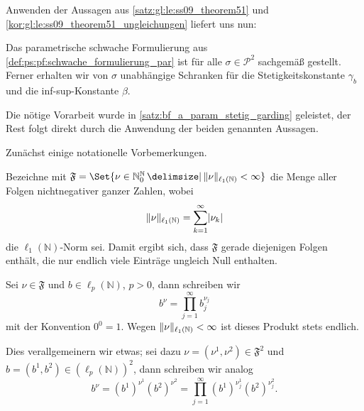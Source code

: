 Anwenden der Aussagen aus \cref{satz:gl:le:ss09_theorem51} und \cref{kor:gl:le:ss09_theorem51_ungleichungen} liefert uns nun:
\begin{Korollar}
\label{satz:ps:eel:schwache_formulierung_sachgemaess_gestellt}
    Das parametrische schwache Formulierung aus \cref{def:ps:pf:schwache_formulierung_par} ist für alle $\sigma \in \mathcal P^{2}$ sachgemäß gestellt.
    Ferner erhalten wir von $\sigma$ unabhängige Schranken für die Stetigkeitskonstante $\gamma_{b}$ und die inf-sup-Konstante $\beta$.

    \begin{Beweis}
        Die nötige Vorarbeit wurde in \cref{satz:bf_a_param_stetig_garding} geleistet, der Rest folgt direkt durch die Anwendung der beiden genannten Aussagen.
    \end{Beweis}
\end{Korollar}

Zunächst einige notationelle Vorbemerkungen.
\begin{Bemerkung}
    Bezeichne mit $\mathfrak F = \Set{ \nu \in \mathbb{N}^{\mathbb{N}}_{0} \given \norm{\nu}_{\ell_{1}(\mathbb{N})} < \infty }$ die Menge aller Folgen nichtnegativer ganzer Zahlen, wobei
    \begin{equation}
        \lVert\nu\rVert_{\ell_{1}(\mathbb{N})} = \sum_{k = 1}^{\infty} \lvert\nu_{k}\rvert
    \end{equation}
    die $\ell_{1}(\mathbb{N})$-Norm sei.
    Damit ergibt sich, dass $\mathfrak F$ gerade diejenigen Folgen enthält, die nur endlich viele Einträge ungleich Null enthalten.

    Sei $\nu \in \mathfrak F$ und $b \in \ell_{p}(\mathbb{N})$, $p > 0$, dann schreiben wir
    \begin{equation}
        b^{\nu} = \prod_{j = 1}^{\infty} b_{j}^{\nu_{j}}
    \end{equation}
    mit der Konvention $0^{0} = 1$.
    Wegen $\lVert\nu\rVert_{\ell_{1}(\mathbb{N})} < \infty$ ist dieses Produkt stets endlich.

    Dies verallgemeinern wir etwas; sei dazu $\nu = (\nu^{1}, \nu^{2}) \in \mathfrak F^{2}$ und $b = (b^{1}, b^{2}) \in (\ell_{p}(\mathbb{N}))^{2}$, dann schreiben wir analog
    \begin{equation}
        b^{\nu} = (b^{1})^{\nu^{1}} (b^{2})^{\nu^{2}} = \prod_{j = 1}^{\infty} (b^{1})^{\nu^{1}_{j}} (b^{2})^{\nu^{2}_{j}}.
    \end{equation}
\end{Bemerkung}

